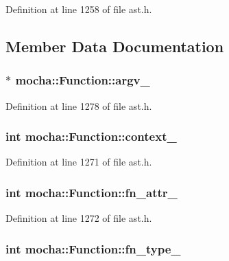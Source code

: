 Definition at line 1258 of file ast.h.



\subsection{Member Data Documentation}
\hypertarget{classmocha_1_1_function_a11310ef6f72f85539da7a1a2f500aa81}{
\subsubsection[{argv\_\-}]{$\ast$ {\bf mocha::Function::argv\_\-}}}
\label{classmocha_1_1_function_a11310ef6f72f85539da7a1a2f500aa81}


Definition at line 1278 of file ast.h.

\hypertarget{classmocha_1_1_function_a91db13aafbd564b49413f780450fedb4}{
\subsubsection[{context\_\-}]{\setlength{\rightskip}{0pt plus 5cm}int {\bf mocha::Function::context\_\-}}}
\label{classmocha_1_1_function_a91db13aafbd564b49413f780450fedb4}


Definition at line 1271 of file ast.h.

\hypertarget{classmocha_1_1_function_ac2610c4e7f6eed41c2a213161d63a7e0}{
\subsubsection[{fn\_\-attr\_\-}]{\setlength{\rightskip}{0pt plus 5cm}int {\bf mocha::Function::fn\_\-attr\_\-}}}
\label{classmocha_1_1_function_ac2610c4e7f6eed41c2a213161d63a7e0}


Definition at line 1272 of file ast.h.

\hypertarget{classmocha_1_1_function_ab96b5bc0337b378b937eb721568c02dc}{
\subsubsection[{fn\_\-type\_\-}]{\setlength{\rightskip}{0pt plus 5cm}int {\bf mocha::Function::fn\_\-type\_\-}}}
\label{classmocha_1_1_function_ab96b5bc0337b378b937eb721568c02dc}



